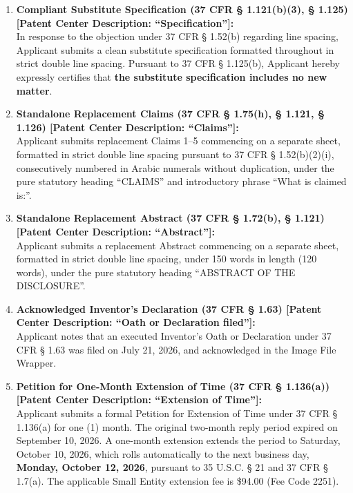 \documentclass[11pt,letterpaper]{article}
\begin{document}
\begin{enumerate}[leftmargin=*]
    \item \textbf{Compliant Substitute Specification (37 CFR \S{} 1.121(b)(3), \S{} 1.125) [Patent Center Description: ``Specification'']:} \\
    In response to the objection under 37 CFR \S{} 1.52(b) regarding line spacing, Applicant submits a clean substitute specification formatted throughout in strict double line spacing. Pursuant to 37 CFR \S{} 1.125(b), Applicant hereby expressly certifies that \textbf{the substitute specification includes no new matter}.

    \item \textbf{Standalone Replacement Claims (37 CFR \S{} 1.75(h), \S{} 1.121, \S{} 1.126) [Patent Center Description: ``Claims'']:} \\
    Applicant submits replacement Claims 1--5 commencing on a separate sheet, formatted in strict double line spacing pursuant to 37 CFR \S{} 1.52(b)(2)(i), consecutively numbered in Arabic numerals without duplication, under the pure statutory heading ``CLAIMS'' and introductory phrase ``What is claimed is:''.

    \item \textbf{Standalone Replacement Abstract (37 CFR \S{} 1.72(b), \S{} 1.121) [Patent Center Description: ``Abstract'']:} \\
    Applicant submits a replacement Abstract commencing on a separate sheet, formatted in strict double line spacing, under 150 words in length (120 words), under the pure statutory heading ``ABSTRACT OF THE DISCLOSURE''.

    \item \textbf{Acknowledged Inventor's Declaration (37 CFR \S{} 1.63) [Patent Center Description: ``Oath or Declaration filed'']:} \\
    Applicant notes that an executed Inventor's Oath or Declaration under 37 CFR \S{} 1.63 was filed on July 21, 2026, and acknowledged in the Image File Wrapper.

    \item \textbf{Petition for One-Month Extension of Time (37 CFR \S{} 1.136(a)) [Patent Center Description: ``Extension of Time'']:} \\
    Applicant submits a formal Petition for Extension of Time under 37 CFR \S{} 1.136(a) for one (1) month. The original two-month reply period expired on September 10, 2026. A one-month extension extends the period to Saturday, October 10, 2026, which rolls automatically to the next business day, \textbf{Monday, October 12, 2026}, pursuant to 35 U.S.C. \S{} 21 and 37 CFR \S{} 1.7(a). The applicable Small Entity extension fee is \$94.00 (Fee Code 2251).


\end{enumerate}
\end{document}
